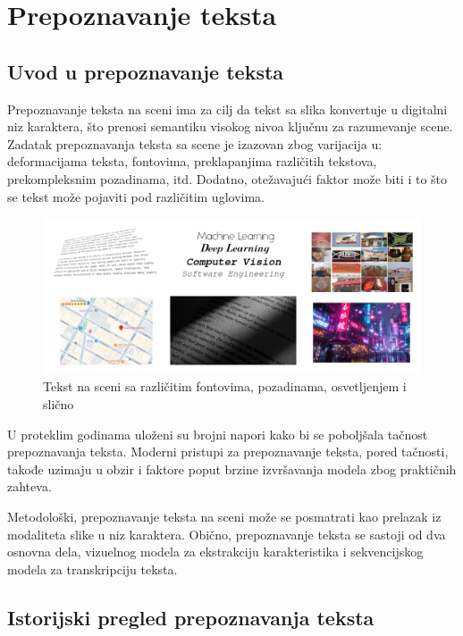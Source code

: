 \documentclass[a4paper,12pt]{article}
\begin{document}
	\section{Prepoznavanje teksta}
	\subsection{Uvod u prepoznavanje teksta}
	Prepoznavanje teksta na sceni ima za cilj da tekst sa slika konvertuje u digitalni niz karaktera, što prenosi semantiku visokog nivoa ključnu za razumevanje scene. Zadatak prepoznavanja teksta sa scene je izazovan zbog varijacija u: deformacijama teksta, fontovima, preklapanjima različitih tekstova, prekompleksnim pozadinama, itd. Dodatno, otežavajući faktor može biti i to što se tekst može pojaviti pod različitim uglovima.
	
	\begin{figure}[H]
		\centering
		\includegraphics[width=\textwidth]{assets/text-in-the-wild.png}
		\caption{Tekst na sceni sa različitim fontovima, pozadinama, osvetljenjem i slično}
		\label{fig:text-on-scene}
	\end{figure}
	
	U proteklim godinama uloženi su brojni napori kako bi se poboljšala tačnost prepoznavanja teksta. Moderni pristupi za prepoznavanje teksta, pored tačnosti, takođe uzimaju u obzir i faktore poput brzine izvršavanja modela zbog praktičnih zahteva.
	
	Metodološki, prepoznavanje teksta na sceni može se posmatrati kao prelazak iz modaliteta slike u niz karaktera. Obično, prepoznavanje teksta se sastoji od dva osnovna dela, vizuelnog modela za ekstrakciju karakteristika i sekvencijskog modela za transkripciju teksta.
	\newpage
	
	\subsection{Istorijski pregled prepoznavanja teksta}
	
\end{document}
